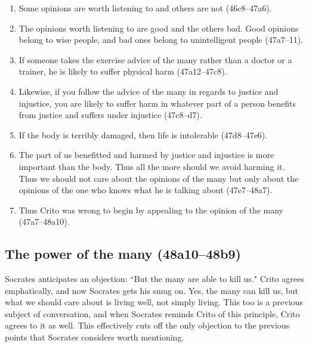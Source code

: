 \documentclass[11pt]{article}
\begin{document}
\begin{enumerate}

    \item Some opinions are worth listening to and others are not
        (46c8--47a6).

    \item The opinions worth listening to are good and the others bad.
        Good opinions belong to wise people, and bad ones belong to
        unintelligent people (47a7--11).

    \item If someone takes the exercise advice of the many rather than
        a doctor or a trainer, he is likely to suffer physical harm
        (47a12--47c8).

    \item Likewise, if you follow the advice of the many in regards to
        justice and injustice, you are likely to suffer harm in whatever
        part of a person benefits from justice and suffers under injustice
        (47c8--d7).

    \item If the body is terribly damaged, then life is intolerable
        (47d8--47e6).

    \item The part of us benefitted and harmed by justice and injustice is
        more important than the body.  Thus all the more should we avoid
        harming it.  Thus we should not care about the opinions of the many
        but only about the opinions of the one who knows what he is talking
        about (47e7--48a7).

    \item Thus Crito was wrong to begin by appealing to the opinion of the
        many (47a7--48a10).

\end{enumerate}


\subsection{The power of the many (48a10--48b9)}

Socrates anticipates an objection: ``But the many are able to kill us."
Crito agrees emphatically, and now Socrates gets his smug on. Yes, the many
can kill us, but what we should care about is living well, not simply
living.  This too is a previous subject of conversation, and when Socrates
reminds Crito of this principle, Crito agrees to it as well.  This
effectively cuts off the only objection to the previous points that
Socrates considers worth mentioning.
\end{document}
